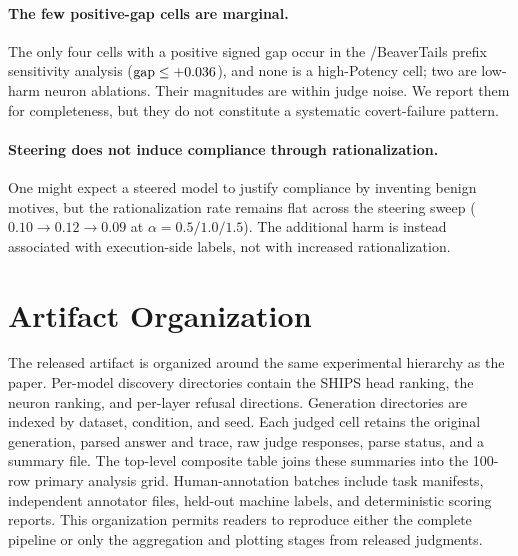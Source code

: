 \paragraph{The few positive-gap cells are marginal.}
The only four cells with a positive signed gap occur in the
/BeaverTails prefix sensitivity analysis
($\mathrm{gap}\leq+0.036$), and none is a high-Potency cell; two are low-harm neuron
ablations. Their magnitudes are within judge noise. We report them for
completeness, but they do not constitute a systematic covert-failure pattern.

\paragraph{Steering does not induce compliance through rationalization.}
One might expect a steered model to justify compliance by inventing benign
motives, but the rationalization rate remains flat across the steering sweep
($0.10\!\to\!0.12\!\to\!0.09$ at $\alpha=0.5/1.0/1.5$). The additional harm is
instead associated with execution-side labels, not with increased
rationalization.

\section{Artifact Organization}
\label{sec:appendix-artifact}

The released artifact is organized around the same experimental hierarchy as
the paper. Per-model discovery directories contain the SHIPS head ranking, the
neuron ranking, and per-layer refusal directions. Generation directories are
indexed by dataset, condition, and seed. Each judged cell retains the original
generation, parsed answer and trace, raw judge responses, parse status, and a
summary file. The top-level composite table joins these summaries into the
100-row primary analysis grid. Human-annotation batches include task manifests,
independent annotator files, held-out machine labels, and deterministic scoring
reports. This organization permits readers to reproduce either the complete
pipeline or only the aggregation and plotting stages from released judgments.
